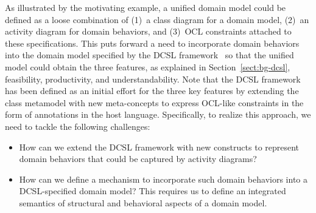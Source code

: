 As illustrated by the motivating example, a unified domain model could be defined as a loose combination of (1)~a class diagram for a domain model, (2)~an activity diagram for domain behaviors, and (3)~OCL constraints attached to these specifications. This puts forward a need to incorporate domain behaviors into the domain model specified by the DCSL framework~\cite{le_domain_2018} so that the unified model could obtain the three features, as explained in Section~\ref{sect:bg-dcsl}, feasibility, productivity, and understandability. Note that the DCSL framework has been defined as an initial effort for the three key features by extending the class metamodel with new meta-concepts to express OCL-like constraints in the form of annotations in the host language. Specifically, to realize this approach, we need to tackle the following challenges:

\begin{itemize}
    \item How can we extend the DCSL framework with new constructs to represent domain behaviors that could be captured by activity diagrams?
    \item How can we define a mechanism to incorporate such domain behaviors into a DCSL-specified domain model? This requires us to define an integrated semantics of structural and behavioral aspects of a domain model.
\end{itemize}


